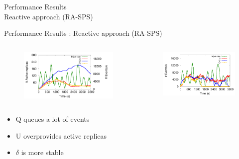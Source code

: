 \begin{frame}[noframenumbering]
	\centering
	\huge Performance Results \\ Reactive approach (RA-SPS)
\end{frame}

\begin{frame}{Performance Results : Reactive approach (RA-SPS)}
	\begin{columns}
	\begin{column}{0.6\textwidth}
    	\begin{figure}
		\includegraphics[width=\textwidth]{images/exp/reactive/TwitterLinear-Replicas.pdf}

		\end{figure}
	\end{column}
    \begin{column}{0.55\textwidth}
	    \begin{figure}
		\includegraphics[width=\textwidth]{images/exp/reactive/TwitterLinear-Throughput.pdf}
		\end{figure}
	\end{column}
	\end{columns}
	
	\begin{itemize}
		\item Q queues a lot of events
		\item U overprovides active replicas
		\item $\delta$ is more stable
	\end{itemize}
\end{frame}

